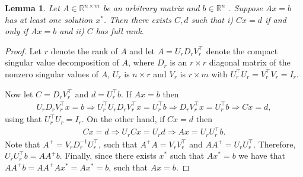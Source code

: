 \documentclass[a4paper,11pt]{article}
\newtheorem{lemma}{Lemma}
\newcommand{\R}{\mathbb{R}}
\begin{document}
\begin{lemma}\label{lem:fullrank}
 Let $A\in \mathbb R^{n\times m}$ be an arbitrary matrix and $b\in \R^n$ . Suppose $Ax=b$ has at least one solution $x^*$. Then there exists $C,d$ such that \textit{i)} $Cx=d$ if and only if $Ax=b$ and \textit{ii)} $C$ has full rank.
\end{lemma}
\begin{proof}
    Let $r$ denote the rank of $A$ and let $A=U_rD_rV_r^\top$ denote the compact singular value decomposition of $A$, where $D_r$ is an $r\times r$ diagonal matrix of the nonzero singular values of $A$, $U_r$ is $n\times r$ and $V_r$ is $r\times m$ with $U_r^\top U_r =V_r^\top V_r =I_r$. 

   Now let $C=D_rV_r^\top$ and $d=U_r^\top b$. If $Ax=b$ then
    \begin{eqnarray}
        U_r D_r V_r^\top x =b \Rightarrow U_r^\top U_rD_r V_r^\top x=U_r^\top b \Rightarrow D_r V_r^\top x=U_r^\top b \Rightarrow Cx=d,
    \end{eqnarray}
using that $U_r^\top U_r=I_r$. On the other hand, if $Cx=d$ then
\begin{eqnarray}
 Cx=d\Rightarrow   U_r Cx=U_r d\Rightarrow Ax=U_rU_r^\top b.
\end{eqnarray}
  Note that $A^+ =V_r D_r^{-1}U_r^\top$, such that $A^+A=V_rV_r^\top $ and $AA^+=U_r U_r^\top$. Therefore, $U_r U_r^\top b=AA^+b$. 
  Finally, since there exists $x^*$ such that $Ax^*=b$ we have that $AA^+b=AA^+Ax^*=Ax^*=b$, such that $Ax=b$.
\end{proof}
\end{document}
